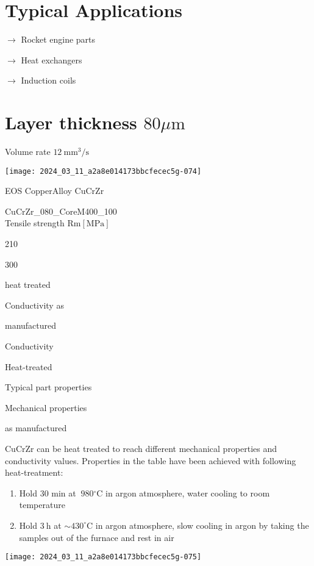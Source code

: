 \documentclass[10pt]{article}
\begin{document}
\section*{Typical Applications}
$\longrightarrow$ Rocket engine parts

$\longrightarrow$ Heat exchangers

$\longrightarrow$ Induction coils

\section*{Layer thickness $80 \mu \mathrm{m}$}
Volume rate $12 \mathrm{~mm}^{3} / \mathrm{s}$

\begin{center}
\texttt{[image: 2024\_03\_11\_a2a8e014173bbcfecec5g-074]}
\end{center}

EOS CopperAlloy CuCrZr

CuCrZr\_080\_CoreM400\_100\\
Tensile strength $\mathrm{Rm}[\mathrm{MPa}]$

210

300

heat treated

Conductivity as

manufactured

Conductivity

Heat-treated

Typical part properties

Mechanical properties

as manufactured

$\mathrm{CuCrZr}$ can be heat treated to reach different mechanical properties and conductivity values. Properties in the table have been achieved with following heat-treatment:

\begin{enumerate}
  \item Hold 30 min at $~ 980{ }^{\circ} \mathrm{C}$ in argon atmosphere, water cooling to room temperature

  \item Hold $3 \mathrm{~h}$ at $\sim 430^{\circ} \mathrm{C}$ in argon atmosphere, slow cooling in argon by taking the samples out of the furnace and rest in air

\end{enumerate}

\begin{center}
\texttt{[image: 2024\_03\_11\_a2a8e014173bbcfecec5g-075]}
\end{center}
\end{document}
